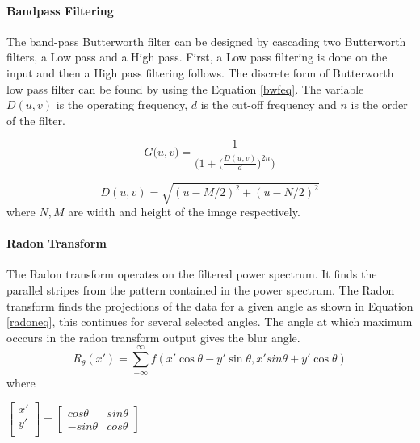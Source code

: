 	\paragraph*{Bandpass Filtering} \hfill \break
	 The band-pass Butterworth filter can be designed by cascading two Butterworth filters, a Low pass and a High pass. First, a Low pass filtering is done on the input and then a High pass filtering follows. The discrete form of Butterworth low pass filter can be found by using the Equation \ref{bwfeq}. The variable $D(u,v)$ is the operating frequency, $d$ is the cut-off frequency and $n$ is the order of the filter.	
	
	\begin{equation}\label{bwfeq}
	G\big(u,v) = \frac{1}{\big(1+\big(\frac{D(u,v)}{d}\big)^{2 n}\big)}
	\end{equation}
	 \par\noindent \vspace{0.2cm}
	\begin{equation} \label{dist}
	D(u,v)=\sqrt{(u-M/2)^2+(u-N/2)^2}
	\end{equation}
	where $N,M$ are width and height of the image respectively.

	\paragraph*{Radon Transform} \hfill \break
	The Radon transform operates on the filtered power spectrum. It finds the parallel stripes from the pattern contained in the power spectrum. The Radon transform finds the projections of the data for a given angle as shown in Equation \ref{radoneq}, this continues for several selected angles. The angle at which maximum occcurs in the radon transform output gives the blur angle.
	\begin{equation}\label{radoneq}
	R_\theta(x')=\sum_{-\infty}^{\infty} f(x'\cos\theta-y'\sin\theta,x'sin\theta + y'\cos\theta)
	\end{equation}
	where 
	
	$\begin{bmatrix}
		x'\\
		y'\\
	\end{bmatrix} = \begin{bmatrix}
	cos\theta & sin\theta \\
	-sin\theta & cos\theta
	\end{bmatrix}$ 
	
